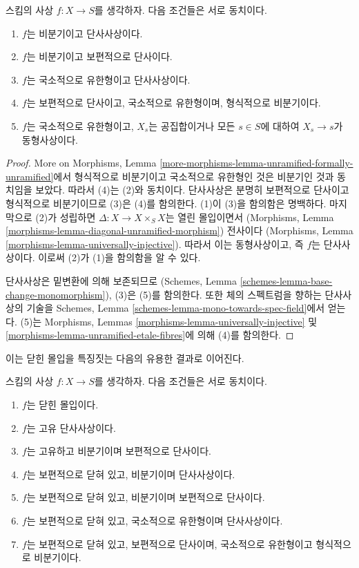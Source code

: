 \begin{lemma}
\label{lemma-universally-injective-unramified}
스킴의 사상 $f : X \to S$를 생각하자.
다음 조건들은 서로 동치이다.
\begin{enumerate}
\item $f$는 비분기이고 단사사상이다.
\item $f$는 비분기이고 보편적으로 단사이다.
\item $f$는 국소적으로 유한형이고 단사사상이다.
\item $f$는 보편적으로 단사이고, 국소적으로 유한형이며,
형식적으로 비분기이다.
\item $f$는 국소적으로 유한형이고, $X_s$는 공집합이거나
모든 $s \in S$에 대하여 $X_s \to s$가 동형사상이다.
\end{enumerate}
\end{lemma}

\begin{proof}
More on Morphisms, Lemma
\ref{more-morphisms-lemma-unramified-formally-unramified}에서
형식적으로 비분기이고 국소적으로 유한형인 것은 비분기인 것과
동치임을 보았다. 따라서 (4)는 (2)와 동치이다.
단사사상은 분명히 보편적으로 단사이고 형식적으로 비분기이므로
(3)은 (4)를 함의한다.
(1)이 (3)을 함의함은 명백하다. 마지막으로 (2)가 성립하면
$\Delta : X \to X \times_S X$는 열린 몰입이면서
(Morphisms, Lemma
\ref{morphisms-lemma-diagonal-unramified-morphism})
전사이다
(Morphisms, Lemma
\ref{morphisms-lemma-universally-injective}).
따라서 이는 동형사상이고, 즉 $f$는 단사사상이다.
이로써 (2)가 (1)을 함의함을 알 수 있다.

\medskip\noindent
단사사상은 밑변환에 의해 보존되므로 (Schemes, Lemma
\ref{schemes-lemma-base-change-monomorphism}), (3)은 (5)를
함의한다. 또한 체의 스펙트럼을 향하는 단사사상의 기술을
Schemes, Lemma
\ref{schemes-lemma-mono-towards-spec-field}에서 얻는다.
(5)는 Morphisms, Lemmas
\ref{morphisms-lemma-universally-injective} 및
\ref{morphisms-lemma-unramified-etale-fibres}에 의해 (4)를
함의한다.
\end{proof}

\noindent
이는 닫힌 몰입을 특징짓는 다음의 유용한 결과로 이어진다.

\begin{lemma}
\label{lemma-characterize-closed-immersion}
스킴의 사상 $f : X \to S$를 생각하자.
다음 조건들은 서로 동치이다.
\begin{enumerate}
\item $f$는 닫힌 몰입이다.
\item $f$는 고유 단사사상이다.
\item $f$는 고유하고 비분기이며 보편적으로 단사이다.
\item $f$는 보편적으로 닫혀 있고, 비분기이며 단사사상이다.
\item $f$는 보편적으로 닫혀 있고, 비분기이며 보편적으로 단사이다.
\item $f$는 보편적으로 닫혀 있고, 국소적으로 유한형이며 단사사상이다.
\item $f$는 보편적으로 닫혀 있고, 보편적으로 단사이며,
국소적으로 유한형이고 형식적으로 비분기이다.
\end{enumerate}
\end{lemma}

